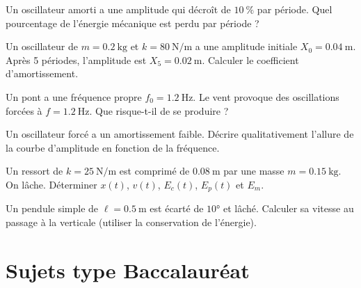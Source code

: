 
\exo{} Un oscillateur amorti a une amplitude qui décroît de $\SI{10}{\percent}$ par période. Quel pourcentage de l'énergie mécanique est perdu par période ?

\exo{} Un oscillateur de $m = \SI{0.2}{\kilogram}$ et $k = \SI{80}{\newton\per\metre}$ a une amplitude initiale $X_0 = \SI{0.04}{\metre}$. Après 5 périodes, l'amplitude est $X_5 = \SI{0.02}{\metre}$. Calculer le coefficient d'amortissement.


\exo{} Un pont a une fréquence propre $f_0 = \SI{1.2}{\hertz}$. Le vent provoque des oscillations forcées à $f = \SI{1.2}{\hertz}$. Que risque-t-il de se produire ?

\exo{} Un oscillateur forcé a un amortissement faible. Décrire qualitativement l'allure de la courbe d'amplitude en fonction de la fréquence.


\exo{} Un ressort de $k = \SI{25}{\newton\per\metre}$ est comprimé de $\SI{0.08}{\metre}$ par une masse $m = \SI{0.15}{\kilogram}$. On lâche. Déterminer $x(t)$, $v(t)$, $E_c(t)$, $E_p(t)$ et $E_m$.

\exo{} Un pendule simple de $\ell = \SI{0.5}{\metre}$ est écarté de $\ang{10}$ et lâché. Calculer sa vitesse au passage à la verticale (utiliser la conservation de l'énergie).

\section{Sujets type Baccalauréat}

